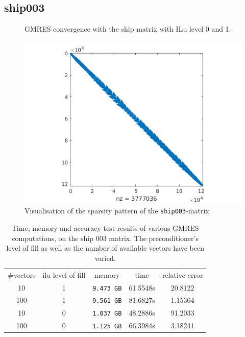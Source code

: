 \subsection{ship003}
\begin{figure}
\centering

\caption{GMRES convergence with the ship matrix with ILu level 0 and 1.}
\label{fig:shipConvergence}
\end{figure}
\begin{figure}
\centering
\includegraphics[width=0.7\linewidth]{../src/figure/ship}
\caption{Visualisation of the sparsity pattern of the \texttt{ship003}-matrix}
\label{fig:ship}
\end{figure}
\begin{table}
\centering
\begin{tabular}{|c|c|c|c|c|} \hline
  \#vectors & ilu level of fill & memory & time & relative error \\
   10  & 1 & \texttt{9.473 GB} & 61.5548s & 20.8122\\
   100 & 1 & \texttt{9.561 GB}  & 81.6827s & 1.15364 \\
   10  & 0 & \texttt{1.037 GB}  & 48.2886s & 91.2033 \\ 
   100 & 0 & \texttt{1.125 GB}  & 66.3984s & 3.18241 \\ \hline
\end{tabular}
\caption{Time, memory and accuracy test results of various GMRES computations, on the ship 003 matrix. The preconditioner's level of fill as well as the number of available vectors have been varied.}
\label{tab:shipGMRES}
\end{table}
